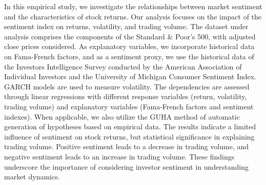 
\begin{Abstrakt}
    In this empirical study, we investigate the relationships between market sentiment and the characteristics of stock returns. Our analysis focuses on the impact of the sentiment index on returns, volatility, and trading volume. The dataset under analysis comprises the components of the Standard \& Poor’s 500, with adjusted close prices considered. As explanatory variables, we incorporate historical data on Fama-French factors, and as a sentiment proxy, we use the historical data of the Investors Intelligence Survey conducted by the American Association of Individual Investors and the University of Michigan Consumer Sentiment Index. GARCH models are used to measure volatility. The dependencies are assessed through linear regressions with different response variables (return, volatility, trading volume) and explanatory variables (Fama-French factors and sentiment indexes). When applicable, we also utilize the GUHA method of automatic generation of hypotheses based on empirical data. The results indicate a limited influence of sentiment on stock returns, but statistical significance in explaining trading volume. Positive sentiment leads to a decrease in trading volume, and negative sentiment leads to an increase in trading volume. These findings underscore the importance of considering investor sentiment in understanding market dynamics.
\end{Abstrakt}



\clearpage